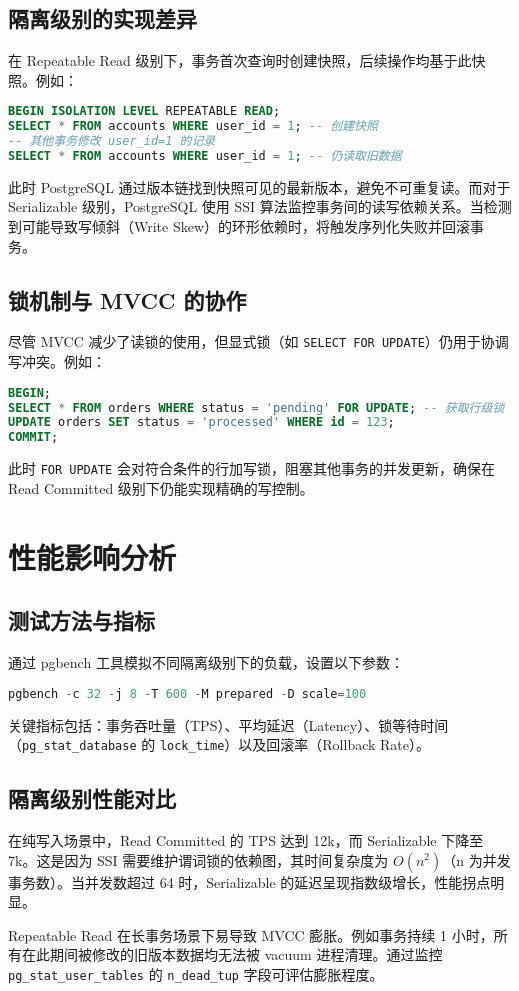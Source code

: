 \section{隔离级别的实现差异}
在 Repeatable Read 级别下，事务首次查询时创建快照，后续操作均基于此快照。例如：\par
\begin{lstlisting}[language=sql]
BEGIN ISOLATION LEVEL REPEATABLE READ;
SELECT * FROM accounts WHERE user_id = 1; -- 创建快照
-- 其他事务修改 user_id=1 的记录
SELECT * FROM accounts WHERE user_id = 1; -- 仍读取旧数据
\end{lstlisting}
此时 PostgreSQL 通过版本链找到快照可见的最新版本，避免不可重复读。而对于 Serializable 级别，PostgreSQL 使用 SSI 算法监控事务间的读写依赖关系。当检测到可能导致写倾斜（Write Skew）的环形依赖时，将触发序列化失败并回滚事务。\par
\section{锁机制与 MVCC 的协作}
尽管 MVCC 减少了读锁的使用，但显式锁（如 \texttt{SELECT FOR UPDATE}）仍用于协调写冲突。例如：\par
\begin{lstlisting}[language=sql]
BEGIN;
SELECT * FROM orders WHERE status = 'pending' FOR UPDATE; -- 获取行级锁
UPDATE orders SET status = 'processed' WHERE id = 123;
COMMIT;
\end{lstlisting}
此时 \texttt{FOR UPDATE} 会对符合条件的行加写锁，阻塞其他事务的并发更新，确保在 Read Committed 级别下仍能实现精确的写控制。\par
\chapter{性能影响分析}
\section{测试方法与指标}
通过 pgbench 工具模拟不同隔离级别下的负载，设置以下参数：\par
\begin{lstlisting}[language=sql]
pgbench -c 32 -j 8 -T 600 -M prepared -D scale=100
\end{lstlisting}
关键指标包括：事务吞吐量（TPS）、平均延迟（Latency）、锁等待时间（\texttt{pg\_{}stat\_{}database} 的 \texttt{lock\_{}time}）以及回滚率（Rollback Rate）。\par
\section{隔离级别性能对比}
在纯写入场景中，Read Committed 的 TPS 达到 12k，而 Serializable 下降至 7k。这是因为 SSI 需要维护谓词锁的依赖图，其时间复杂度为 $O(n^2)$（n 为并发事务数）。当并发数超过 64 时，Serializable 的延迟呈现指数级增长，性能拐点明显。\par
Repeatable Read 在长事务场景下易导致 MVCC 膨胀。例如事务持续 1 小时，所有在此期间被修改的旧版本数据均无法被 vacuum 进程清理。通过监控 \texttt{pg\_{}stat\_{}user\_{}tables} 的 \texttt{n\_{}dead\_{}tup} 字段可评估膨胀程度。\par
